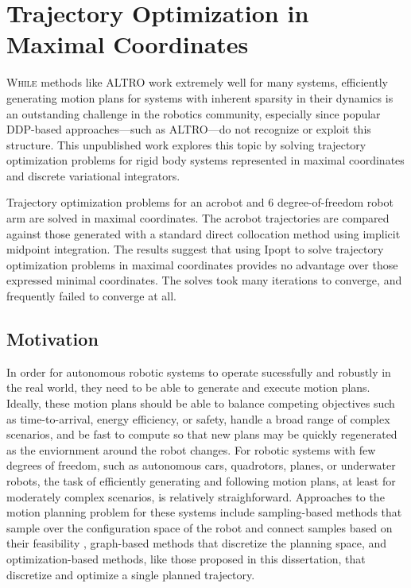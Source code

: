 \documentclass[../root.tex]{subfiles}
\begin{document}
    
\chapter{Trajectory Optimization in Maximal Coordinates}
\label{chap:mctrajop}
\lettrine{W}{hile} methods like ALTRO work extremely well for many systems,
efficiently generating motion plans for systems with inherent sparsity in their 
dynamics is an outstanding challenge in the robotics community, especially since 
popular DDP-based approaches---such as ALTRO---do not recognize or exploit this structure. 
This unpublished work explores this topic by solving trajectory optimization problems for 
rigid body systems represented in maximal coordinates and discrete variational 
integrators. 

Trajectory optimization problems for an acrobot and 6 degree-of-freedom robot arm 
are solved in maximal coordinates. The acrobot trajectories are compared against 
those generated with a standard direct collocation method using implicit midpoint 
integration. The results suggest that using Ipopt to solve trajectory optimization 
problems in maximal coordinates provides no advantage over those expressed minimal 
coordinates. The solves took many iterations to converge, and frequently failed 
to converge at all. 

\section{Motivation}
In order for autonomous robotic systems to operate sucessfully and robustly in the real 
world, they need to be able to generate and execute motion plans. Ideally, these motion 
plans should be able to balance competing objectives such as time-to-arrival, energy 
efficiency, or safety, handle a broad range of complex scenarios, and be fast to compute
so that new plans may be quickly regenerated as the enviornment around the robot changes.
For robotic systems with few degrees of freedom, such as autonomous cars, quadrotors, planes,
or underwater robots, the task of efficiently generating and following motion plans, at least
for moderately complex scenarios, is relatively straighforward. Approaches to the motion 
planning problem for these systems include sampling-based methods that sample over the 
configuration space of the robot and connect samples based on their feasibility 
\cite{lavalle_Planning_2006}, graph-based
methods that discretize the planning space, and optimization-based methods, like those 
proposed in this dissertation,
\cite{howell_ALTRO_2019,jackson_ALTROC_2021,li_Iterative_2004,hargraves_Direct_1987}
that discretize and optimize a single planned trajectory. 
\end{document}
